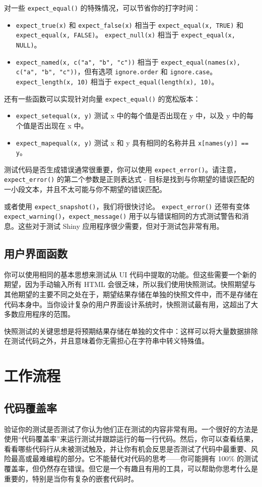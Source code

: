 对一些 \verb|expect_equal()| 的特殊情况，可以节省你的打字时间：
\begin{itemize}
    \item \verb|expect_true(x)| 和 \verb|expect_false(x)| 相当于 \verb|expect_equal(x, TRUE)| 和 \verb|expect_equal(x, FALSE)|。 \verb|expect_null(x)| 相当于 \verb|expect_equal(x, NULL)|。
    \item \verb|expect_named(x, c("a", "b", "c"))| 相当于 \verb|expect_equal(names(x), c("a", "b", "c"))|，但有选项 \verb|ignore.order| 和 \verb|ignore.case|。 \verb|expect_length(x, 10)| 相当于 \verb|expect_equal(length(x), 10)|。
\end{itemize}

还有一些函数可以实现针对向量 \verb|expect_equal()| 的宽松版本：
\begin{itemize}
    \item \verb|expect_setequal(x, y)| 测试 x 中的每个值是否出现在 y 中，以及 y 中的每个值是否出现在 x 中。
    \item \verb|expect_mapequal(x, y)| 测试 x 和 y 具有相同的名称并且 \verb|x[names(y)] == y|。
\end{itemize}

测试代码是否生成错误通常很重要，你可以使用 \verb|expect_error()|。请注意，\verb|expect_error()| 的第二个参数是正则表达式 - 目标是找到与你期望的错误匹配的一小段文本，并且不太可能与你不期望的错误匹配。

或者使用 \verb|expect_snapshot()|，我们将很快讨论。 \verb|expect_error()| 还带有变体 \verb|expect_warning()|，\verb|expect_message()| 用于以与错误相同的方式测试警告和消息。这些对于测试 Shiny 应用程序很少需要，但对于测试包非常有用。
\subsection{用户界面函数}
你可以使用相同的基本思想来测试从 UI 代码中提取的功能。但这些需要一个新的期望，因为手动输入所有 HTML 会很乏味，所以我们使用快照测试。快照期望与其他期望的主要不同之处在于，期望结果存储在单独的快照文件中，而不是存储在代码本身中。当你设计复杂的用户界面设计系统时，快照测试最有用，这超出了大多数应用程序的范围。

快照测试的关键思想是将预期结果存储在单独的文件中：这样可以将大量数据排除在测试代码之外，并且意味着你无需担心在字符串中转义特殊值。
\section{工作流程}
\subsection{代码覆盖率}
验证你的测试是否测试了你认为他们正在测试的内容非常有用。一个很好的方法是使用“代码覆盖率”来运行测试并跟踪运行的每一行代码。然后，你可以查看结果，看看哪些代码行从未被测试触及，并让你有机会反思是否测试了代码中最重要、风险最高或最难编程的部分。它不能替代对代码的思考——你可能拥有 100\% 的测试覆盖率，但仍然存在错误。但它是一个有趣且有用的工具，可以帮助你思考什么是重要的，特别是当你有复杂的嵌套代码时。
